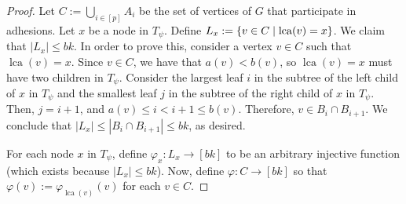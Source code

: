 \documentclass{patmorin}
\renewcommand{\le}{\leqslant}
\renewcommand{\leq}{\leqslant}
\DeclareMathOperator{\lca}{lca}
\DeclarePairedDelimiter{\set}{\{}{\}}
\begin{document}
\begin{proof}
  Let $C:=\bigcup_{i\in[p]} A_i$  be the set of vertices of $G$ that participate in adhesions.
  Let $x$ be a node in $T_{\psi}$.
  Define $L_x := \set{v\in C \mid \lca(v)=x}$.
  We claim that $|L_x| \leq bk$.
  In order to prove this, consider a vertex $v\in C$ such that $\lca(v)=x$.
  Since $v\in C$, we have that $a(v) < b(v)$, so
  $\lca(v)=x$ must have two children in $T_{\psi}$.
  Consider the largest leaf $i$ in the subtree of the left child of $x$ in $T_{\psi}$ and
  the smallest leaf $j$ in the subtree of the right child of $x$ in $T_{\psi}$.
  Then, $j=i+1$, and  $a(v)\leq i < i+1 \leq b(v)$.
  Therefore, $v\in B_{i}\cap B_{i+1}$.
  We conclude that
  $|L_x| \leq |B_i\cap B_{i+1}| \leq bk$, as desired.

  For each node $x$ in $T_{\psi}$, define $\varphi_x: L_x\to[bk]$ to be an arbitrary injective function (which exists because $|L_x|\le bk$). Now,  define $\varphi: C\to [bk]$ so that
  $\varphi(v):=\varphi_{\lca(v)}(v)$ for each $v\in C$.


\end{proof}
\end{document}
